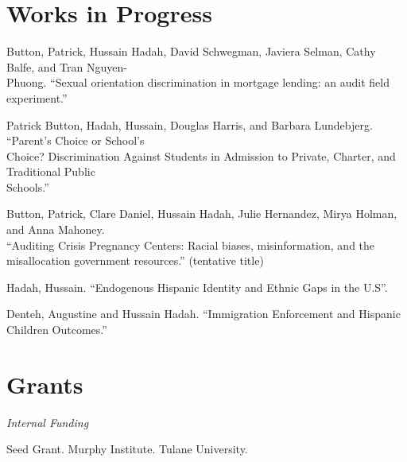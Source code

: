 \documentclass[letterpaper]{article}
\renewenvironment{itemize}{
  \begin{list}{}{
    \setlength{\leftmargin}{1.5em}
  }
}{
  \end{list}
}
\begin{document}
\section*{Works in Progress}
\vspace{2 mm}
\begin{itemize}
\item Button, Patrick, Hussain Hadah, David Schwegman, Javiera Selman, Cathy Balfe, and Tran Nguyen-\\{\makebox[4mm]{\hfill}}Phuong. ``Sexual orientation discrimination in mortgage lending: an audit field experiment.''

\item Patrick Button, Hadah, Hussain, Douglas Harris, and Barbara Lundebjerg. ``Parent’s Choice or School’s \\{\makebox[4mm]{\hfill}} Choice?
Discrimination Against Students in Admission to Private, Charter, and Traditional Public \\{\makebox[4mm]{\hfill}} Schools.''

\item Button, Patrick, Clare Daniel, Hussain Hadah, 
Julie Hernandez, Mirya Holman, and Anna Mahoney. 
\\{\makebox[4mm]{\hfill}}``Auditing Crisis
 Pregnancy Centers: Racial biases, misinformation, 
and the\\{\makebox[4mm]{\hfill}} misallocation government resources.'' (tentative title)

\item Hadah, Hussain. ``Endogenous Hispanic Identity and Ethnic Gaps in the U.S''.
\item Denteh, Augustine and Hussain Hadah. ``Immigration Enforcement and Hispanic Children Outcomes.''

\end{itemize}


\section*{Grants}
\vspace{2 mm}
\textit{Internal Funding
}\begin{itemize}
  \item {}Seed Grant. Murphy Institute. Tulane University.
\end{itemize}
\vspace{2 mm}
\end{document}
